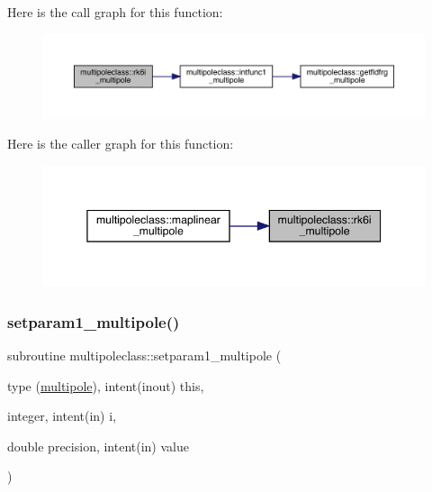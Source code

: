 Here is the call graph for this function\+:\nopagebreak
\begin{figure}[H]
\begin{center}
\leavevmode
\includegraphics[width=350pt]{namespacemultipoleclass_aebbed53759ae97dc55df35264c89274c_cgraph}
\end{center}
\end{figure}
Here is the caller graph for this function\+:\nopagebreak
\begin{figure}[H]
\begin{center}
\leavevmode
\includegraphics[width=345pt]{namespacemultipoleclass_aebbed53759ae97dc55df35264c89274c_icgraph}
\end{center}
\end{figure}
\mbox{\label{namespacemultipoleclass_a85869614f5049e8bb17c4f195011fca5}} 
\subsubsection{\texorpdfstring{setparam1\_multipole()}{setparam1\_multipole()}}
{\footnotesize\ttfamily subroutine multipoleclass\+::setparam1\+\_\+multipole (\begin{DoxyParamCaption}\item[{type (\mbox{\hyperlink{namespacemultipoleclass_structmultipoleclass_1_1multipole}{multipole}}), intent(inout)}]{this,  }\item[{integer, intent(in)}]{i,  }\item[{double precision, intent(in)}]{value }\end{DoxyParamCaption})}

